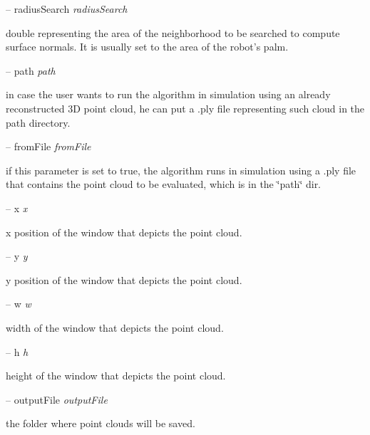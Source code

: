 -- radius\+Search {\itshape radius\+Search} 
\begin{DoxyItemize}
\item double representing the area of the neighborhood to be searched to compute surface normals. It is usually set to the area of the robot's palm.
\end{DoxyItemize}

-- path {\itshape path} 
\begin{DoxyItemize}
\item in case the user wants to run the algorithm in simulation using an already reconstructed 3\+D point cloud, he can put a .ply file representing such cloud in the path directory.
\end{DoxyItemize}

-- from\+File {\itshape from\+File} 
\begin{DoxyItemize}
\item if this parameter is set to true, the algorithm runs in simulation using a .ply file that contains the point cloud to be evaluated, which is in the \char`\"{}path\char`\"{} dir.
\end{DoxyItemize}

-- x {\itshape x} 
\begin{DoxyItemize}
\item x position of the window that depicts the point cloud.
\end{DoxyItemize}

-- y {\itshape y} 
\begin{DoxyItemize}
\item y position of the window that depicts the point cloud.
\end{DoxyItemize}

-- w {\itshape w} 
\begin{DoxyItemize}
\item width of the window that depicts the point cloud.
\end{DoxyItemize}

-- h {\itshape h} 
\begin{DoxyItemize}
\item height of the window that depicts the point cloud.
\end{DoxyItemize}

-- output\+File {\itshape output\+File} 
\begin{DoxyItemize}
\item the folder where point clouds will be saved.
\end{DoxyItemize}

